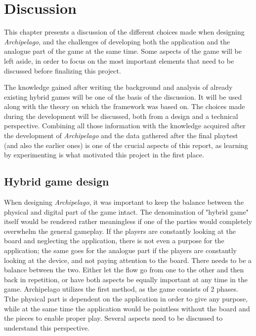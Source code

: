 \chapter{Discussion}
\label{sec:disc}
This chapter presents a discussion of the different choices made when designing \textit{Archipelago}, and the challenges of developing both the application and the analogue part of the game at the same time. Some aspects of the game will be left aside, in order to focus on the most important elements that need to be discussed before finalizing this project.

The knowledge gained after writing the background and analysis of already existing hybrid games will be one of the basis of the discussion. It will be used along with the theory on which the framework was based on. The choices made during the development will be discussed, both from a design and a technical perspective. Combining all those information with the knowledge acquired after the development of \textit{Archipelago} and the data gathered after the final playtest (and also the earlier ones) is one of the crucial aspects of this report, as learning by experimenting is what motivated this project in the first place. 

\section{Hybrid game design}
When designing \textit{Archipelago}, it was important to keep the balance between the physical and digital part of the game intact. The denomination of "hybrid game" itself would be rendered rather meaningless if one of the parties would completely overwhelm the general gameplay. If the players are constantly looking at the board and neglecting the application, there is not even a purpose for the application; the same goes for the analogue part if the players are constantly looking at the device, and not paying attention to the board. There needs to be a balance between the two. Either let the flow go from one to the other and then back in repetition, or have both aspects be equally important at any time in the game. 
Archipelago utilizes the first method, as the game consists of 2 phases. Tthe physical part is dependent on the application in order to give any purpose, while at the same time the application would be pointless without the board and the pieces to enable proper play. Several aspects need to be discussed to understand this perspective.

